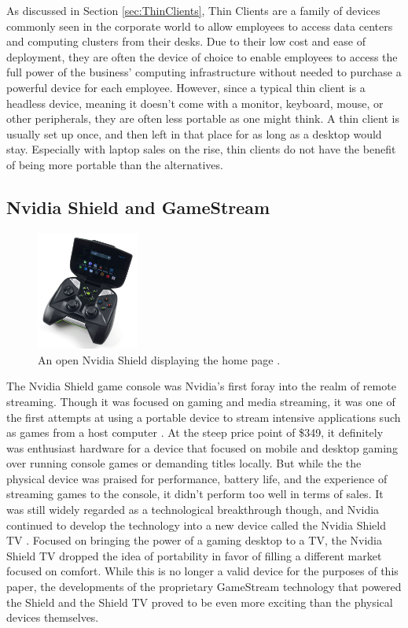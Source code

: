 As discussed in Section \ref{sec:ThinClients}, Thin Clients are a family of devices commonly seen in the corporate world to allow employees to access data centers and computing clusters from their desks.
Due to their low cost and ease of deployment, they are often the device of choice to enable employees to access the full power of the business' computing infrastructure without needed to purchase a powerful device for each employee.
However, since a typical thin client is a headless device, meaning it doesn't come with a monitor, keyboard, mouse, or other peripherals, they are often less portable as one might think.
A thin client is usually set up once, and then left in that place for as long as a desktop would stay.
Especially with laptop sales on the rise, thin clients do not have the benefit of being more portable than the alternatives.

\subsection{Nvidia Shield and GameStream}\label{subsec:NvidiaShieldAndGameStream}

\begin{figure}
  \centering
  \includegraphics[width=0.3\textwidth]{Figures/nvidia-shield-open-ifixit}
  \caption[Nvidia Shield]{An open Nvidia Shield displaying the home page \cite{ImageNvidiaShield}.}
  \label{fig:nvidiashield}
\end{figure}

The Nvidia Shield game console was Nvidia's first foray into the realm of remote streaming.
Though it was focused on gaming and media streaming, it was one of the first attempts at using a portable device to stream intensive applications such as games from a host computer \cite{brown_2013}.
At the steep price point of \$349, it definitely was enthusiast hardware for a device that focused on mobile and desktop gaming over running console games or demanding titles locally.
But while the the physical device was praised for performance, battery life, and the experience of streaming games to the console, it didn't perform too well in terms of sales.
It was still widely regarded as a technological breakthrough though, and Nvidia continued to develop the technology into a new device called the Nvidia Shield TV \cite{daniel_2017}.
Focused on bringing the power of a gaming desktop to a TV, the Nvidia Shield TV dropped the idea of portability in favor of filling a different market focused on comfort.
While this is no longer a valid device for the purposes of this paper, the developments of the proprietary GameStream technology that powered the Shield and the Shield TV proved to be even more exciting than the physical devices themselves.

